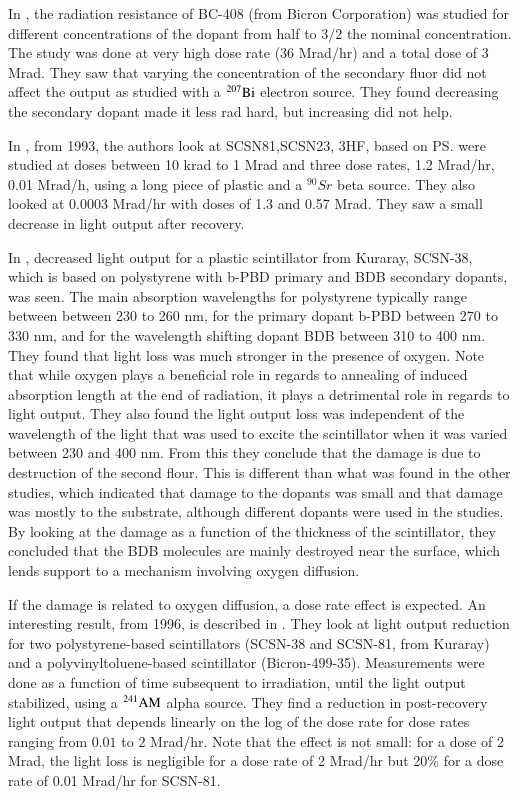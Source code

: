 \documentclass[review]{elsarticle}
\begin{document}
In \cite{Majewski1989500}, the radiation resistance of BC-408 (from Bicron Corporation) was studied for different concentrations of the dopant from half to $3/2$ the nominal concentration.  The study was done at very high dose rate (36 Mrad/hr) and a total dose of 3 Mrad.  They saw that varying the concentration of the secondary fluor did not affect the output as studied with a $\rm{^{207}Bi}$ electron source.  They found decreasing the secondary dopant made it less rad hard, but increasing did not help.  

In \cite{Giokaris1993315}, from 1993, the authors look at SCSN81,SCSN23, 3HF, based on PS. were studied at doses between 10 krad to 1 Mrad and three dose rates, 1.2 Mrad/hr, 0.01 Mrad/h, using a long piece of plastic and a ${^{90}Sr}$ beta source.
They also looked at 0.0003 Mrad/hr with doses of 1.3 and 0.57 Mrad.
They saw a small decrease in light output after recovery.

In \cite{Wick1991472}, decreased light
output for a plastic scintillator from Kuraray, SCSN-38, which
is based on polystyrene with b-PBD primary and BDB secondary dopants, was seen.
The main absorption wavelengths for polystyrene typically range between
between 230 to 260 nm, for the primary dopant b-PBD between 270 to 330 nm,
and for the wavelength shifting dopant BDB between 310 to 400 nm.
They found that light loss was much stronger in the presence of oxygen.
Note that while oxygen plays a beneficial role in regards
to annealing of induced absorption length at the end of radiation, 
it plays a detrimental role in 
regards to light output.  
They also found the light output loss
was independent of the wavelength of the light
that was used to excite the scintillator when it
was varied between 230 and 400 nm.
From this they conclude that the damage is due to destruction
of the second flour.  This is different than what was found in
the other studies, which indicated that damage to the dopants was
small and that damage was mostly to the substrate,
although different dopants were used in the studies.
By looking at the damage as a function of the thickness of the scintillator,
they concluded that the BDB molecules are mainly destroyed
near the surface, which lends support to a mechanism involving
oxygen diffusion.

If the damage is related to oxygen diffusion, a dose rate effect
is expected.
An interesting result, from 1996, is described in \cite{Biagtan1996125}.  They look at light output reduction for two
polystyrene-based scintillators (SCSN-38 and SCSN-81, from Kuraray) and a
polyvinyltoluene-based scintillator (Bicron-499-35).  
Measurements were done as a function of time subsequent to irradiation, until the light output stabilized, using a ${\rm ^{241}AM}$ alpha source.
They find a reduction in post-recovery light output that depends linearly on the
log of the dose rate for dose rates ranging from $0.01$ to
$2$ Mrad/hr.  Note that the effect is not small: for a
dose of 2 Mrad, the light loss is negligible for a dose rate
of 2 Mrad/hr but 20\% for a dose rate of 0.01 Mrad/hr for SCSN-81.
\end{document}
